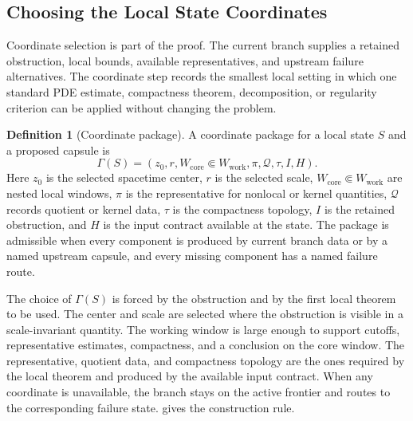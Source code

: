 \documentclass[11pt]{article}
\theoremstyle{plain}
\theoremstyle{definition}
\newtheorem{definition}[theorem]{Definition}
\theoremstyle{remark}
\begin{document}
\subsection{Choosing the Local State Coordinates}
\label{subsec:state-coordinate-selection}

Coordinate selection is part of the proof.  The current branch supplies a
retained obstruction, local bounds, available representatives, and upstream
failure alternatives.  The coordinate step records the smallest local setting
in which one standard PDE estimate, compactness theorem, decomposition, or
regularity criterion can be applied without changing the problem.

\begin{definition}[Coordinate package]
A coordinate package for a local state \(S\) and a proposed capsule is
\[
  \Gamma(S)
  =
  (z_0,r,W_{\mathrm{core}}\Subset W_{\mathrm{work}},
    \pi,\mathcal Q,\tau,I,H).
\]
Here \(z_0\) is the selected spacetime center, \(r\) is the selected scale,
\(W_{\mathrm{core}}\Subset W_{\mathrm{work}}\) are nested local windows,
\(\pi\) is the representative for nonlocal or kernel quantities,
\(\mathcal Q\) records quotient or kernel data, \(\tau\) is the compactness
topology, \(I\) is the retained obstruction, and \(H\) is the input contract
available at the state.  The package is admissible when every component is
produced by current branch data or by a named upstream capsule, and every
missing component has a named failure route.
\end{definition}

The choice of \(\Gamma(S)\) is forced by the obstruction and by the first local
theorem to be used.  The center and scale are selected where the obstruction is
visible in a scale-invariant quantity.  The working window is large enough to
support cutoffs, representative estimates, compactness, and a conclusion on the core
window.  The representative, quotient data, and compactness topology
are the ones required by the local theorem and produced by the available input
contract.  When any coordinate is unavailable, the branch stays on the active
frontier and routes to the corresponding failure state.
 gives the construction rule.
\end{document}

